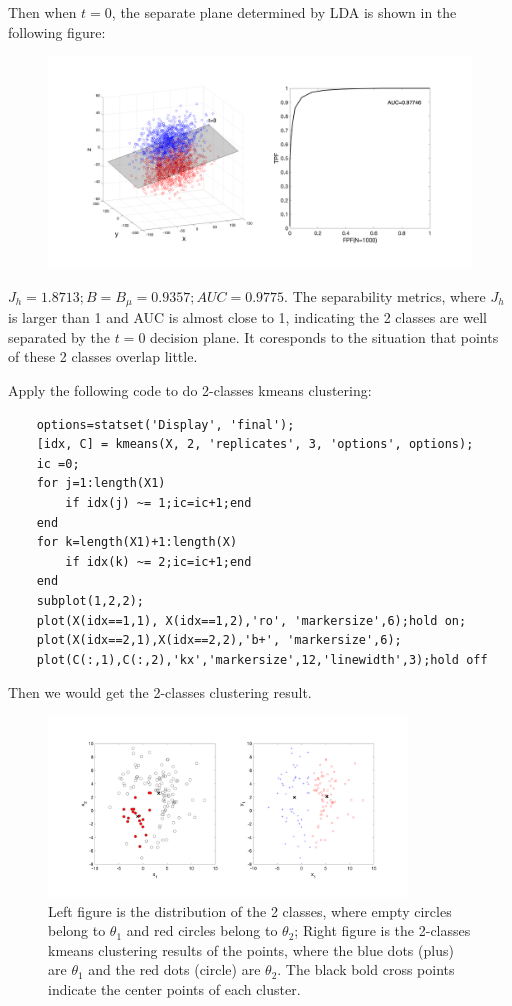 \documentclass[12pt,a4paper]{article}
\begin{document}
    Then when $t=0$, the separate plane determined by LDA is shown in the following figure:
    \begin{figure}[!ht]
        \includegraphics[width=\textwidth]{hw9_4.png}
    \end{figure}

    $J_h=1.8713;B=B_\mu=0.9357;AUC=0.9775$. The separability metrics, where $J_h$ is larger than 1 and AUC is almost close to 1, indicating the 2 classes are well separated by the $t=0$ decision plane. It coresponds to the situation that points of these 2 classes overlap little.
    
    \newpage
    Apply the following code to do 2-classes kmeans clustering:
    \begin{lstlisting}
    options=statset('Display', 'final');
    [idx, C] = kmeans(X, 2, 'replicates', 3, 'options', options);
    ic =0;
    for j=1:length(X1)
        if idx(j) ~= 1;ic=ic+1;end
    end
    for k=length(X1)+1:length(X)
        if idx(k) ~= 2;ic=ic+1;end
    end
    subplot(1,2,2);
    plot(X(idx==1,1), X(idx==1,2),'ro', 'markersize',6);hold on;
    plot(X(idx==2,1),X(idx==2,2),'b+', 'markersize',6);
    plot(C(:,1),C(:,2),'kx','markersize',12,'linewidth',3);hold off
    \end{lstlisting}

    Then we would get the 2-classes clustering result.
    \vspace{-0.5cm}
    \begin{figure}[!ht]
        \centering
        \includegraphics[width=0.85\textwidth]{hw9_5.png}
        \vspace{-0.5cm}
        \caption{Left figure is the distribution of the 2 classes, where empty circles belong to $\theta_1$ and red circles belong to $\theta_2$; Right figure is the 2-classes kmeans clustering results of the points, where the blue dots (plus) are $\theta_1$ and the red dots (circle) are $\theta_2$. The black bold cross points indicate the center points of each cluster.}
    \end{figure}
\end{document}
